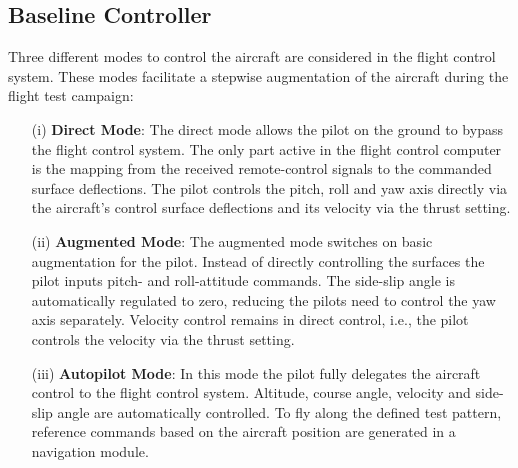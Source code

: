\documentclass[aerospace,article,submit,moreauthors,pdftex,10pt,a4paper]{Definitions/mdpi}
\begin{document}
\subsection{Baseline Controller}
Three different modes to control the aircraft are considered in the flight control system. These modes facilitate a stepwise augmentation of the aircraft during the flight test campaign:

\begin{itemize}
	\item[(i)] \textbf{Direct Mode}: The direct mode allows the pilot on the ground to bypass the flight control system. The only part active in the flight control computer is the mapping from the received remote-control signals to the commanded surface deflections. The pilot controls the pitch, roll and yaw axis directly via the aircraft's control surface deflections and its velocity via the thrust setting. 
	
	\item[(ii)] \textbf{Augmented Mode}: The augmented mode switches on basic augmentation for the pilot. Instead of directly controlling the surfaces the pilot inputs pitch- and roll-attitude commands. The side-slip angle is automatically regulated to zero, reducing the pilots need to control the yaw axis separately. Velocity control remains in direct control, i.e., the pilot controls the velocity via the thrust setting.
	
	\item[(iii)] \textbf{Autopilot Mode}: In this mode the pilot  fully delegates the aircraft control to the flight control system. Altitude, course angle, velocity and side-slip angle are automatically controlled. To fly along the defined test pattern, reference commands based on the aircraft position are generated in a navigation module.
\end{itemize}
\end{document}
